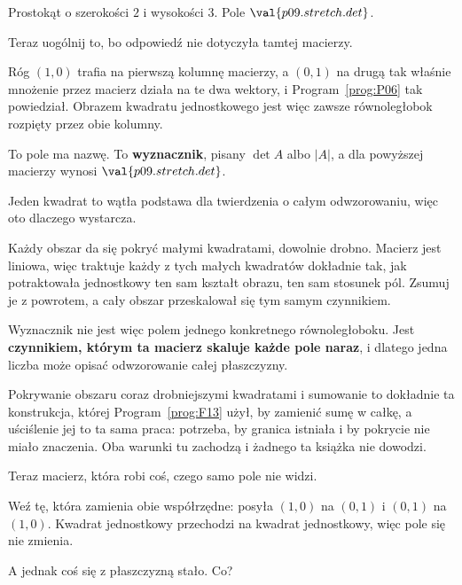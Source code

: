 \begin{fr}
\begin{ansblock}
Prostokąt o szerokości $2$ i wysokości $3$. Pole $\val{p09.stretch.det}$.
\end{ansblock}

Teraz uogólnij to, bo odpowiedź nie dotyczyła tamtej macierzy.

Róg $(1,0)$ trafia na pierwszą kolumnę macierzy, a $(0,1)$ na drugą \dash{} tak
właśnie mnożenie przez macierz działa na te dwa wektory, i Program~\ref{prog:P06}
tak powiedział. Obrazem kwadratu jednostkowego jest więc zawsze równoległobok
rozpięty przez obie kolumny.

To pole ma nazwę. To \textbf{wyznacznik}, pisany $\det A$ albo
$\lvert A \rvert$, a dla powyższej macierzy wynosi $\val{p09.stretch.det}$.
\end{fr}

\begin{fr}
Jeden kwadrat to wątła podstawa dla twierdzenia o całym odwzorowaniu, więc oto
dlaczego wystarcza.

Każdy obszar da się pokryć małymi kwadratami, dowolnie drobno. Macierz jest
liniowa, więc traktuje każdy z tych małych kwadratów dokładnie tak, jak
potraktowała jednostkowy \dash{} ten sam kształt obrazu, ten sam stosunek pól.
Zsumuj je z powrotem, a cały obszar przeskalował się tym samym czynnikiem.

Wyznacznik nie jest więc polem jednego konkretnego równoległoboku. Jest
\textbf{czynnikiem, którym ta macierz skaluje każde pole naraz}, i dlatego
jedna liczba może opisać odwzorowanie całej płaszczyzny.
\end{fr}

\begin{rigourbox}
Pokrywanie obszaru coraz drobniejszymi kwadratami i sumowanie to dokładnie ta
konstrukcja, której Program~\ref{prog:F13} użył, by zamienić sumę w całkę, a
uściślenie jej to ta sama praca: potrzeba, by granica istniała i by pokrycie
nie miało znaczenia. Oba warunki tu zachodzą i żadnego ta książka nie dowodzi.
\end{rigourbox}


\begin{fr}
Teraz macierz, która robi coś, czego samo pole nie widzi.

Weź tę, która zamienia obie współrzędne: posyła $(1,0)$ na $(0,1)$ i $(0,1)$ na
$(1,0)$. Kwadrat jednostkowy przechodzi na kwadrat jednostkowy, więc pole się
nie zmienia.

A jednak coś się z płaszczyzną stało. Co?
\dotline
\nextframe
\end{fr}

